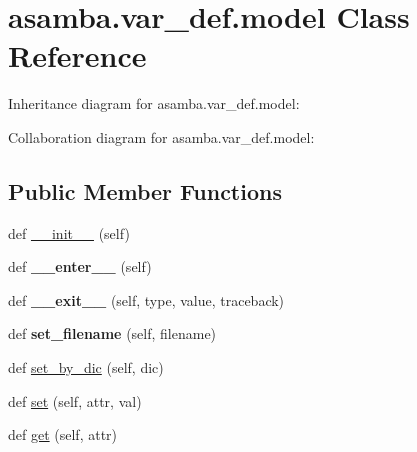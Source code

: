 \hypertarget{classasamba_1_1var__def_1_1model}{}\section{asamba.\+var\+\_\+def.\+model Class Reference}
\label{classasamba_1_1var__def_1_1model}


Inheritance diagram for asamba.\+var\+\_\+def.\+model\+:


Collaboration diagram for asamba.\+var\+\_\+def.\+model\+:
\subsection*{Public Member Functions}
\begin{DoxyCompactItemize}
\item 
def \hyperlink{classasamba_1_1var__def_1_1model_a6bb4340f0dd97b1311eb7b3e053de0c7}{\+\_\+\+\_\+init\+\_\+\+\_\+} (self)
\item 
\mbox{\label{classasamba_1_1var__def_1_1model_a6a49d75a9ee4d9eed26b01023eff743f}} 
def {\bfseries \+\_\+\+\_\+enter\+\_\+\+\_\+} (self)
\item 
\mbox{\label{classasamba_1_1var__def_1_1model_ab85d274fc5f0d3c17ee11b4d0e5fa739}} 
def {\bfseries \+\_\+\+\_\+exit\+\_\+\+\_\+} (self, type, value, traceback)
\item 
\mbox{\label{classasamba_1_1var__def_1_1model_a843e0624678507d02e9c8e6656563440}} 
def {\bfseries set\+\_\+filename} (self, filename)
\item 
def \hyperlink{classasamba_1_1var__def_1_1model_a49205357c320bfe944bc1177b3d3a4ee}{set\+\_\+by\+\_\+dic} (self, dic)
\item 
def \hyperlink{classasamba_1_1var__def_1_1model_adf918a64e584736b39e108f4c705d413}{set} (self, attr, val)
\item 
def \hyperlink{classasamba_1_1var__def_1_1model_abc39be012825aa3842b694adc8a3b697}{get} (self, attr)
\end{DoxyCompactItemize}
